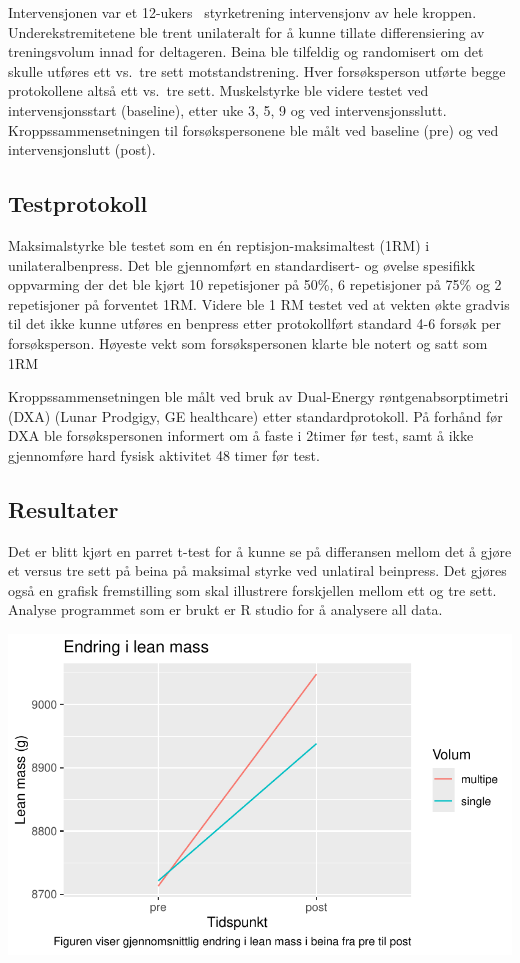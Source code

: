 \documentclass[
  letterpaper,
  DIV=11,
  numbers=noendperiod]{scrreprt}
\begin{document}
Intervensjonen var et 12-ukers ~styrketrening intervensjonv av hele
kroppen. Underekstremitetene ble trent unilateralt for å kunne tillate
differensiering av treningsvolum innad for deltageren. Beina ble
tilfeldig og randomisert om det skulle utføres ett vs.~tre sett
motstandstrening. Hver forsøksperson utførte begge protokollene altså
ett vs.~tre sett. Muskelstyrke ble videre testet ved intervensjonsstart
(baseline), etter uke 3, 5, 9 og ved intervensjonsslutt.
Kroppssammensetningen til forsøkspersonene ble målt ved baseline (pre)
og ved intervensjonslutt (post).

\subsection{Testprotokoll}\label{testprotokoll}

Maksimalstyrke ble testet som en én reptisjon-maksimaltest (1RM) i
unilateralbenpress. Det ble gjennomført en standardisert- og øvelse
spesifikk oppvarming der det ble kjørt 10 repetisjoner på 50\%, 6
repetisjoner på 75\% og 2 repetisjoner på forventet 1RM. Videre ble 1 RM
testet ved at vekten økte gradvis til det ikke kunne utføres en benpress
etter protokollført standard 4-6 forsøk per forsøksperson. Høyeste vekt
som forsøkspersonen klarte ble notert og satt som 1RM

Kroppssammensetningen ble målt ved bruk av Dual-Energy
røntgenabsorptimetri (DXA) (Lunar Prodgigy, GE healthcare) etter
standardprotokoll. På forhånd før DXA ble forsøkspersonen informert om å
faste i 2timer før test, samt å ikke gjennomføre hard fysisk aktivitet
48 timer før test.

\subsection{Resultater}\label{resultater}

Det er blitt kjørt en parret t-test for å kunne se på differansen mellom
det å gjøre et versus tre sett på beina på maksimal styrke ved unlatiral
beinpress. Det gjøres også en grafisk fremstilling som skal illustrere
forskjellen mellom ett og tre sett. Analyse programmet som er brukt er R
studio for å analysere all data.

\includegraphics{05-repeated-measurements_files/figure-pdf/unnamed-chunk-3-1.pdf}
\end{document}

